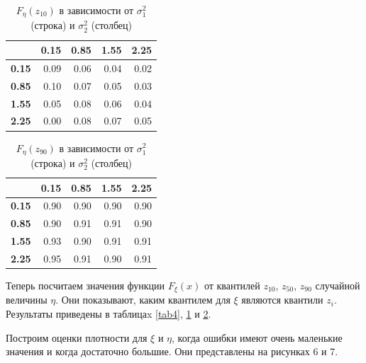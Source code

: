 \documentclass[12pt]{article}
\begin{document}
	\begin{table}[!hhh]
		\centering
		\caption{$F_{\eta}(z_{10})$ в зависимости от $\sigma_{1}^{2}$ (строка) и $\sigma_{2}^{2}$ (столбец) }
		\label{tab5}
		\begin{tabular}{rrrrr}
			\hline
			& \textbf{0.15} & \textbf{0.85} & \textbf{1.55} & \textbf{2.25} \\
			\hline
			\textbf{0.15} & 0.09 & 0.06 & 0.04 & 0.02 \\ 
			\textbf{0.85} & 0.10 & 0.07 & 0.05 & 0.03 \\ 
			\textbf{1.55} & 0.05 & 0.08 & 0.06 & 0.04 \\ 
			\textbf{2.25} & 0.00 & 0.08 & 0.07 & 0.05 \\ 
			\hline
		\end{tabular}
	\end{table}
	
	\begin{table}[!hhh]
		\centering
		\caption{$F_{\eta}(z_{90})$ в зависимости от $\sigma_{1}^{2}$ (строка) и $\sigma_{2}^{2}$ (столбец) }
		\label{tab6}
		\begin{tabular}{rrrrr}
			\hline
			& \textbf{0.15} & \textbf{0.85} & \textbf{1.55} & \textbf{2.25} \\
			\hline
			\textbf{0.15} & 0.90 & 0.90 & 0.90 & 0.90 \\ 
			\textbf{0.85} & 0.90 & 0.91 & 0.91 & 0.90 \\ 
			\textbf{1.55} & 0.93 & 0.90 & 0.91 & 0.91 \\ 
			\textbf{2.25} & 0.95 & 0.91 & 0.90 & 0.91 \\ 
			\hline
		\end{tabular}
	\end{table}
	
	Теперь посчитаем значения функции $F_{\xi}(x)$ от квантилей $z_{10}$, $z_{50}$, $z_{90}$ случайной величины $\eta$. Они показывают, каким квантилем для $\xi$ являются квантили $z_{i}$. Результаты приведены в таблицаx \ref{tab4}, \ref{tab5} и \ref{tab6}.
	
	Построим оценки плотности для $\xi$ и $\eta$, когда ошибки имеют очень маленькие значения и когда достаточно большие. Они представлены на рисунках 6 и 7.
	
\end{document}
